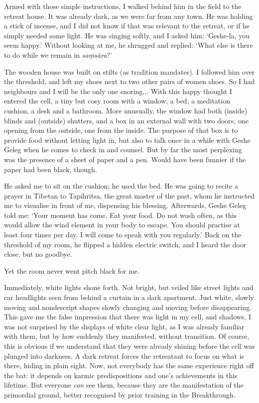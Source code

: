 \documentclass[11pt,twocolumn]{article}
\begin{document}
Armed with those simple instructions, I walked behind him in the field
to the retreat house. It was already dark, as we were far from any
town. He was holding a stick of incense, and I did not know if that
was relevant to the retreat, or if he simply needed some light. He was
singing softly, and I asked him: `Geshe-la, you seem happy.' Without
looking at me, he shrugged and replied: `What else is there to do
while we remain in \emph{sa\d{m}s\={a}ra}?'

The wooden house was built on stilts (as tradition mandates). I
followed him over the threshold, and left my shoes next to two other
pairs of women shoes. So I had neighbours and I will be the only one
snoring... With this happy thought I entered the cell, a tiny but
cosy room with a window, a bed, a meditation cushion, a desk and a
bathroom. More unusually, the window had both (inside) blinds and
(outside) shutters, and a box in an external wall with two doors, one
opening from the outside, one from the inside. The purpose of that box
is to provide food without letting light in, but also to talk once in
a while with Geshe Geleg when he comes to check in and counsel. But by
far the most perplexing was the presence of a sheet of paper and a
pen. Would have been funnier if the paper had been black, though.

He asked me to sit on the cushion; he used the bed. He was going to
recite a prayer in Tibetan to Tapihritsa, the great master of the
past, whom he instructed me to visualise in front of me, dispensing
his blessing. Afterwards, Geshe Geleg told me: `Your moment has
come. Eat your food. Do not wash often, as this would allow the wind
element in your body to escape. You should practise at least four
times per day. I will come to speak with you regularly.' Back on the
threshold of my room, he flipped a hidden electric switch, and I heard
the door close, but no goodbye.

Yet the room never went pitch black for me.

Immediately, white lights shone forth. Not bright, but veiled like
street lights and car headlights seen from behind a curtain in a dark
apartment. Just white, slowly moving and nondescript shapes slowly
changing and moving before disappearing. This gave me the false
impression that there was light in my cell, and shadows. I was not
surprised by the displays of white clear light, as I was already
familiar with them, but by how suddenly they manifested, without
transition. Of course, this is obvious if we understand that they were
already shining before the cell was plunged into darkness. A dark
retreat forces the retreatant to focus on what is there, hiding in
plain sight. Now, not everybody has the same experience right off the
bat: it depends on karmic predispositions and one's achievements in
this lifetime. But everyone \emph{can} see them, because they are the
manifestation of the primordial ground, better recognised by prior
training in the Breakthrough.
\end{document}
